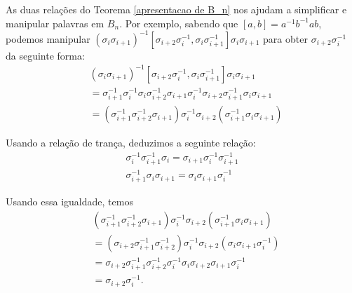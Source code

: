 	\par\vspace{0.3cm} As duas relações do Teorema \eqref{apresentacao de B_n} nos ajudam a simplificar e manipular palavras em $B_n$. Por exemplo, sabendo que $[a,b] = a^{-1}b^{-1}ab$, podemos manipular $(\sigma_i\sigma_{i+1})^{-1}[\sigma_{i+2}\sigma_i^{-1}, \sigma_i\sigma_{i+1}^{-1}]\sigma_i\sigma_{i+1}$ para obter $\sigma_{i+2}\sigma_i^{-1}$ da seguinte forma:
	\begin{align*}
	&(\sigma_i\sigma_{i+1})^{-1}[\sigma_{i+2}\sigma_i^{-1}, \sigma_i\sigma_{i+1}^{-1}]\sigma_i\sigma_{i+1} \\ 
	&= \sigma_{i+1}^{-1}\sigma_i^{-1}\sigma_i\sigma_{i+2}^{-1}\sigma_{i+1}\sigma_i^{-1}\sigma_{i+2}\sigma_{i+1}^{-1}\sigma_i\sigma_{i+1}  \\
	&= (\sigma_{i+1}^{-1}\sigma_{i+2}^{-1}\sigma_{i+1})\sigma_i^{-1}\sigma_{i+2}(\sigma_{i+1}^{-1}\sigma_i\sigma_{i+1})
	\end{align*}
	
	\par\vspace{0.3cm} Usando a relação de trança, deduzimos a seguinte relação:
	\begin{align*}
	\sigma_i^{-1}\sigma_{i+1}^{-1}\sigma_i = \sigma_{i+1}\sigma_i^{-1}\sigma_{i+1}^{-1} \\
	\sigma_{i+1}^{-1}\sigma_i\sigma_{i+1} = \sigma_i\sigma_{i+1}\sigma_i^{-1}   
	\end{align*}
	
	\par\vspace{0.3cm} Usando essa igualdade, temos
	\begin{align*}
	&(\sigma_{i+1}^{-1}\sigma_{i+2}^{-1}\sigma_{i+1})\sigma_i^{-1}\sigma_{i+2}(\sigma_{i+1}^{-1}\sigma_i\sigma_{i+1}) \\
	&= (\sigma_{i+2}\sigma_{i+1}^{-1}\sigma_{i+2}^{-1})\sigma_i^{-1}\sigma_{i+2}(\sigma_i\sigma_{i+1}\sigma_i^{-1}) \\
	&= \sigma_{i+2}\sigma_{i+1}^{-1}\sigma_{i+2}^{-1}\sigma_i^{-1}\sigma_i\sigma_{i+2}\sigma_{i+1}\sigma_i^{-1} \\
	&= \sigma_{i+2}\sigma_i^{-1}.
	\end{align*}
	
	
